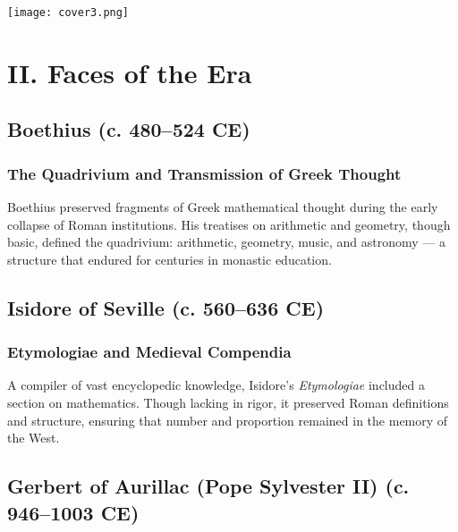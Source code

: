 \documentclass[9pt]{article}
\begin{document}
\begin{center}
    \texttt{[image: cover3.png]}
\end{center}

\newpage

\section*{II. Faces of the Era}

\vspace{0.5em}

\subsection*{Boethius (c. 480–524 CE)}

\subsubsection*{The Quadrivium and Transmission of Greek Thought}

Boethius preserved fragments of Greek mathematical thought during the early collapse of Roman institutions.  
His treatises on arithmetic and geometry, though basic, defined the quadrivium: arithmetic, geometry, music, and astronomy — a structure that endured for centuries in monastic education.

\vspace{0.5em}

\subsection*{Isidore of Seville (c. 560–636 CE)}

\subsubsection*{Etymologiae and Medieval Compendia}

A compiler of vast encyclopedic knowledge, Isidore’s \textit{Etymologiae} included a section on mathematics.  
Though lacking in rigor, it preserved Roman definitions and structure, ensuring that number and proportion remained in the memory of the West.

\vspace{0.5em}

\subsection*{Gerbert of Aurillac (Pope Sylvester II) (c. 946–1003 CE)}
\end{document}
